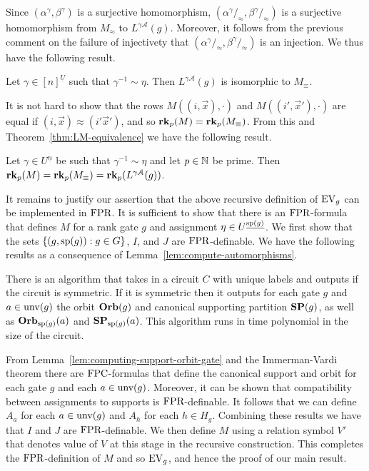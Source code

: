 \documentclass[a4paper,UKenglish]{lipics-v2018}
\begin{document}
Since $(\alpha^{\gamma}, \beta^{\gamma})$ is a surjective homomorphism,
$(\alpha^{\gamma} /_\approx, \beta^{\gamma} /_\approx)$ is a surjective
homomorphism from $M_\approx$ to $L^{\gamma \mathcal{A}}(g)$. Moreover, it
follows from the previous comment on the failure of injectivety that
$(\alpha^{\gamma} /_\approx, \beta^{\gamma} /_\approx)$ is an injection. We thus
have the following result.

\begin{theorem}
	Let $\gamma \in [n]^{\underline{U}}$ such that $\gamma^{-1} \sim \eta$. Then
  $L^{\gamma \mathcal{A}}(g)$ is isomorphic to $M_{\equiv}$.
	\label{thm:LM-equivalence}
\end{theorem}

It is not hard to show that the rows $M ((i, \vec{x}), \cdot)$ and $M((i',
\vec{x}'), \cdot)$ are equal if $(i, \vec{x}) \approx (i' \vec{x}')$, and so
$\text{\textbf{rk}}_p (M) = \text{\textbf{rk}}_p(M_\equiv)$. From this and
Theorem~\ref{thm:LM-equivalence} we have the following result.

\begin{lemma}
	Let $\gamma \in U^{\underline{n}}$ be such that $\gamma^{-1} \sim \eta$ and
  let $p \in \mathbb{N}$ be prime. Then $\text{\textbf{rk}}_p (M) = \text{\textbf{rk}}_p (M_\equiv) = \text{\textbf{rk}}_p
  (L^{\gamma \mathcal{A}}(g))$.
  \label{lem:rank-triple-equivilence}
\end{lemma}

It remains to justify our assertion that the above recursive definition of
$\text{EV}_g$ can be implemented in $\text{\upshape FPR}$. It is sufficient to show that there is an
$\text{\upshape FPR}$-formula that defines $M$ for a rank gate $g$ and assignment $\eta \in
U^{\underline{\text{sp}(g)}}$. We first show that the sets $\{(g, \text{sp}(g)) : g
\in G\}$, $I$, and $J$ are $\text{\upshape FPR}$-definable. We have the following results as a
consequence of Lemma~\ref{lem:compute-automorphisms}.

\begin{lemma}
  There is an algorithm that takes in a circuit $C$ with unique labels and
  outputs if the circuit is symmetric. If it is symmetric then it outputs for
  each gate $g$ and $a \in \text{unv}(g)$ the orbit $\text{\textbf{Orb}}(g)$ and canonical
  supporting partition $\text{\textbf{SP}}(g)$, as well as $\text{\textbf{Orb}}_{\text{sp}(g)}(a)$ and
  $\text{\textbf{SP}}_{\text{sp}(g)}(a)$. This algorithm runs in time polynomial in the size of
  the circuit.
  \label{lem:computing-support-orbit-gate}
\end{lemma}

From Lemma~\ref{lem:computing-support-orbit-gate} and the Immerman-Vardi theorem
there are $\text{\upshape FPC}$-formulas that define the canonical support and orbit for each
gate $g$ and each $a \in \text{unv}(g)$. Moreover, it can be shown that
compatibility between assignments to supports is $\text{\upshape FPR}$-definable. It follows
that we can define $A_a$ for each $a \in \text{unv}(g)$ and $A_h$ for each $h \in
H_g$. Combining these results we have that $I$ and $J$ are $\text{\upshape FPR}$-definable. We
then define $M$ using a relation symbol $V'$ that denotes value of $V$ at this
stage in the recursive construction. This completes the $\text{\upshape FPR}$-definition of $M$
and so $\text{EV}_g$, and hence the proof of our main result.
\end{document}
